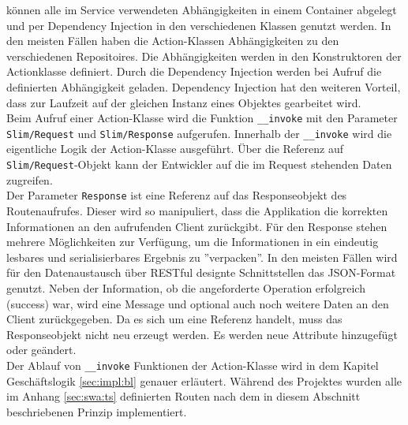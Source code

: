 \documentclass[10pt, oneside, ngerman]{article}
\begin{document}
    können alle im Service verwendeten Abhängigkeiten in einem Container abgelegt und per Dependency Injection in den verschiedenen Klassen genutzt werden. 
    In den meisten Fällen haben die Action-Klassen Abhängigkeiten zu den verschiedenen Repositoires. 
    Die Abhängigkeiten werden in den Konstruktoren der Actionklasse definiert. Durch die Dependency Injection
    werden bei Aufruf die definierten Abhängigkeit geladen. Dependency Injection hat den weiteren Vorteil, dass zur Laufzeit auf der gleichen
    Instanz eines Objektes gearbeitet wird.\\
    Beim Aufruf einer Action-Klasse wird die Funktion \lstinline{__invoke} mit den Parameter \lstinline{Slim/Request} und \lstinline{Slim/Response} aufgerufen. 
    Innerhalb der \lstinline{__invoke} wird die eigentliche Logik der Action-Klasse ausgeführt. Über die Referenz auf \lstinline{Slim/Request}-Objekt kann der Entwickler auf die im Request stehenden Daten zugreifen.\\ 
    Der Parameter \lstinline{Response} ist eine Referenz auf das Responseobjekt des Routenaufrufes. Dieser wird so manipuliert, dass die Applikation die korrekten Informationen an den aufrufenden Client zurückgibt. 
    Für den Response stehen mehrere Möglichkeiten zur Verfügung, um die Informationen in ein eindeutig lesbares und serialisierbares Ergebnis zu ''verpacken''. 
    In den meisten Fällen wird für den Datenaustausch über RESTful designte Schnittstellen das JSON-Format genutzt. Neben der Information, ob 
    die angeforderte Operation erfolgreich (success) war, wird eine Message und optional auch noch weitere Daten an den Client zurückgegeben.
    Da es sich um eine Referenz handelt, muss das Responseobjekt nicht neu erzeugt werden. Es werden neue Attribute hinzugefügt oder geändert.\\ %
    Der Ablauf von \lstinline{__invoke} Funktionen der Action-Klasse wird in dem Kapitel Geschäftslogik \ref{sec:impl:bl} genauer erläutert. 
    Während des Projektes wurden alle im Anhang \ref{sec:swa:ts} definierten Routen nach dem in diesem Abschnitt beschriebenen Prinzip implementiert.   
\end{document}
